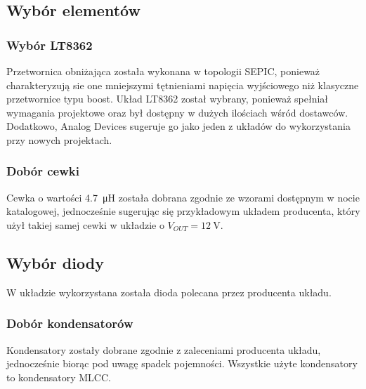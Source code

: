 \documentclass[11pt]{article}
\begin{document}
\begin{figure}[H]
\begin{adjustbox}{width=1.2\textwidth,center}
{

            \label{fig:subfig2}
        }
    \end{adjustbox}
\end{figure}

\subsection{Wybór elementów}
\subsubsection{Wybór LT8362}
Przetwornica obniżająca została wykonana w topologii SEPIC, ponieważ charakteryzują sie one mniejszymi tętnieniami napięcia wyjściowego niż klasyczne przetwornice typu boost. Układ LT8362 został wybrany, ponieważ spełniał wymagania projektowe oraz był dostępny w dużych ilościach wśród dostawców. Dodatkowo, Analog Devices sugeruje go jako jeden z układów do wykorzystania przy nowych projektach.

\subsubsection{Dobór cewki}
Cewka o wartości \SI{4.7}{\micro\henry} została dobrana zgodnie ze wzorami dostępnym w nocie katalogowej, jednocześnie sugerując się przykładowym układem producenta, który użył takiej samej cewki w układzie o $V_{OUT} = \SI{12}{\V}$.

\subsection{Wybór diody}
W układzie wykorzystana została dioda polecana przez producenta układu.

\subsubsection{Dobór kondensatorów}
Kondensatory zostały dobrane zgodnie z zaleceniami producenta układu, jednocześnie biorąc pod uwagę spadek pojemności. Wszystkie użyte kondensatory to kondensatory MLCC.
\end{document}
